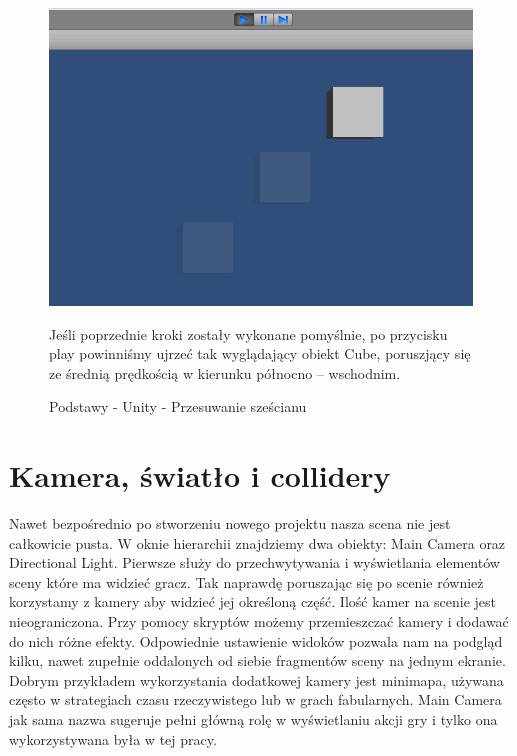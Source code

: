 \documentclass[12pt]{xmgr}
\begin{document}
\begin{figure}[!htb]
    \begin{center}
    \includegraphics[scale=0.25]{Screeny/rodzial5screeny/moving_cube}
    \end{center}
    \caption{Podstawy - Unity - Przesuwanie sześcianu}
Jeśli poprzednie kroki zostały wykonane pomyślnie, po przycisku play powinniśmy ujrzeć tak wyglądający obiekt Cube, poruszjący się ze średnią prędkością w kierunku północno – wschodnim.
\end{figure}


\newpage
\section{Kamera, światło i collidery}

Nawet bezpośrednio po stworzeniu nowego projektu nasza scena nie jest całkowicie pusta. W oknie hierarchii znajdziemy dwa obiekty: Main Camera oraz Directional Light. Pierwsze służy do przechwytywania i wyświetlania elementów sceny które ma widzieć gracz. Tak naprawdę poruszając się po scenie również korzystamy z kamery aby widzieć jej określoną część. Ilość kamer na scenie jest nieograniczona. Przy pomocy skryptów możemy przemieszczać kamery i dodawać do nich różne efekty. Odpowiednie ustawienie widoków pozwala nam na podgląd kilku, nawet zupełnie oddalonych od siebie fragmentów sceny na jednym ekranie. Dobrym przykładem wykorzystania dodatkowej kamery jest minimapa, używana często w strategiach czasu rzeczywistego lub w grach fabularnych.  Main Camera jak sama nazwa sugeruje pełni główną rolę w wyświetlaniu akcji gry i tylko ona wykorzystywana była w tej pracy.
\end{document}
